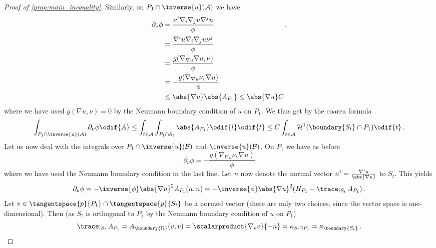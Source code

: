 \documentclass[titlepage,numbers=noenddot,oneside,%
cleardoublepage=empty,paper=a4,fontsize=11pt,%
english,%
]{scrartcl}
\newcommand*{\mathcomma}{\,,}
\newcommand*{\mathfullstop}{\,.}
\begin{document}
{\begin{proof}[Proof of \cref{prop:main_inequality}]
    Similarly, on \( P_1\cap \inverse{u}(\mathcal{A}) \) we have 
    \begin{equation*}
        \begin{aligned}[t]
            \partial_{\nu}\phi&=\frac{\nu^i\nabla_i\nabla_j u \nabla^j u}{\phi}\\ 
            &=\frac{\nabla^i u \nabla_i \nabla_j u \nu^j}{\phi}\\
            &=\frac{g(\nabla_{\nabla u}\nabla u,\nu)}{\phi}\\
            &=-\frac{g(\nabla_{\nabla u}\nu,\nabla u)}{\phi}\\
            &\leq \abs{\nabla u}\abs{A_{P_1}}\leq \abs{\nabla u}C
        \end{aligned}\mathcomma
    \end{equation*}
    where we have used \( g(\nabla u,\nu)=0 \) by the Neumann boundary condition of \( u \) on \( P_1 \). We thus get by the coarea formula
    \begin{equation*}
        \int_{P_1\cap \inverse{u}(\mathcal{A})}\partial_{\nu} \phi\odif{A}\leq \int_{t\in \mathcal{A}}\int_{P_1\cap S_t}\abs{A_{P_1}}\odif{l}\odif{t}\leq C\int_{t\in \mathcal{A}}\mathcal{H}^1(\boundary{S_t}\cap P_1)\odif{t}\mathfullstop
    \end{equation*}
    Let us now deal with the integrals over \( P_1\cap \inverse{u}(\mathcal{B}) \) and \( \inverse{u}(\mathcal{B}) \). On \( P_1 \) we have as before
    \begin{equation*}
        \partial_\nu \phi=-\frac{g(\nabla_{\nabla u}\nu,\nabla u)}{\phi}
    \end{equation*}
    where we have used the Neumann boundary condition in the last line. Let \( n \) now denote the normal vector \( n^i=\frac{\nabla^i u}{\abs{\nabla u}} \) to \( S_t \). This yields
    \begin{equation*}
        \partial_\nu\phi=-\inverse{\phi}\abs{\nabla u}^2A_{P_1}(n,n)=-\inverse{\phi}\abs{\nabla u}^2(H_{P_1}-\trace;_{S_t}A_{P_1})\mathfullstop
    \end{equation*}
    Let \( v\in \tangentspace{p}{P_1}\cap\tangentspace{p}{S_t} \) be a normed vector (there are only two choices, since the vector space is one-dimensional). Then (as \( S_t \) is orthogonal to \( P_1 \) by the Neumann boundary condition of \( u \) on \( P_1 \))
    \begin{equation*}
        \trace;_{S_t}A_{P_1}=A_{\boundary{\Omega}}(v,v)=\scalarproduct{\nabla_{v}v}{-n}=\kappa_{S_t\cap P_1}=\kappa_{\boundary{S_t}}\mathfullstop
    \end{equation*}

\end{proof}}
\end{document}
